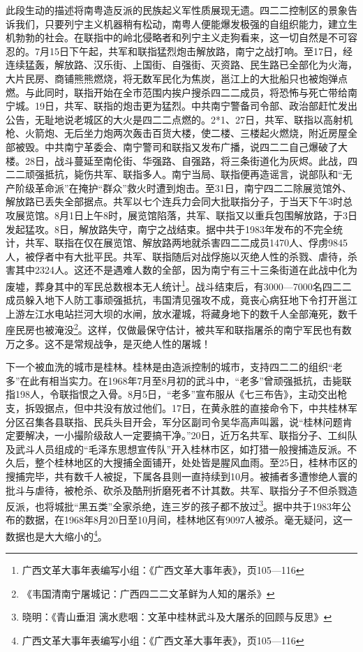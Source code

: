 此段生动的描述将南粤造反派的民族起义军性质展现无遗。四二二控制区的景象告诉我们，只要列宁主义机器稍有松动，南粤人便能爆发极强的自组织能力，建立生机勃勃的社会。在联指中的岭北侵略者和列宁主义走狗看来，这一切自然是不可容忍的。7月15日下午起，共军和联指猛烈炮击解放路，南宁之战打响。至17日，经连续猛轰，解放路、汉乐街、上国街、自强街、灭资路、民生路已全部化为火海，大片民房、商铺熊熊燃烧，将无数军民化为焦炭，邕江上的大批船只也被炮弹点燃。与此同时，联指开始在全市范围内挨户搜杀四二二成员，将恐怖与死亡带给南宁城。19日，共军、联指的炮击更为猛烈。中共南宁警备司令部、政治部赶忙发出公告，无耻地说老城区的大火是四二二点燃的。2*1、27日，共军、联指以高射机枪、火箭炮、无后坐力炮两次轰击百货大楼，使二楼、三楼起火燃烧，附近房屋全部被毁。中共南宁革委会、南宁警司和联指又发布广播，说四二二自己爆破了大楼。28日，战斗蔓延至南伦街、华强路、自强路，将三条街道化为灰烬。此战，四二二顽强抵抗，毙伤共军、联指多人。南宁当局、联指便再造谣言，说部队和“无产阶级革命派”在掩护“群众”救火时遭到炮击。至31日，南宁四二二除展览馆外、解放路已丢失全部据点。共军以七个连兵力会同大批联指分子，于当天下午3时总攻展览馆。8月1日上午8时，展览馆陷落，共军、联指又以重兵包围解放路，于3日发起猛攻。8日，解放路失守，南宁之战结束。据中共于1983年发布的不完全统计，共军、联指在仅在展览馆、解放路两地就杀害四二二成员1470人、俘虏9845人，被俘者中有大批平民。共军、联指随后对战俘施以灭绝人性的杀戮、虐待，杀害其中2324人。这还不是遇难人数的全部，因为南宁有三十三条街道在此战中化为废墟，葬身其中的军民总数根本无人统计\footnote{广西文革大事年表编写小组：《广西文革大事年表》，页105—116}。战斗结束后，有3000—7000名四二二成员躲入地下人防工事顽强抵抗，韦国清见强攻不成，竟丧心病狂地下令打开邕江上游左江水电站拦河大坝的水闸，放水灌城，将藏身地下的数千人全部淹死，数千座民房也被淹没\footnote{《韦国清南宁屠城记：广西四二二文革鲜为人知的屠杀》}。这样，仅做最保守估计，被共军和联指屠杀的南宁军民也有数万之多。这不是常规战争，是灭绝人性的屠城！

下一个被血洗的城市是桂林。桂林是由造派控制的城市，支持四二二的组织“老多”在此有相当实力。在1968年7月至8月初的武斗中，“老多”曾顽强抵抗，击毙联指198人，令联指恨之入骨。8月5日，“老多”宣布服从《七三布告》，主动交出枪支，拆毁据点，但中共没有放过他们。17日，在黄永胜的直接命令下，中共桂林军分区召集各县联指、民兵头目开会，军分区副司令吴华高声叫嚣，说“桂林问题肯定要解决，一小撮阶级敌人一定要搞干净。”20日，近万名共军、联指分子、工纠队及武斗人员组成的“毛泽东思想宣传队”开入桂林市区，如打猎一般搜捕造反派。不久后，整个桂林地区的大搜捕全面铺开，处处皆是腥风血雨。至25日，桂林市区的搜捕完毕，共有数千人被捉，下属各县则一直持续到10月。被捕者多遭惨绝人寰的批斗与虐待，被枪杀、砍杀及酷刑折磨死者不计其数。共军、联指分子不但杀戮造反派，也将城批“黑五类”全家杀绝，连三岁的孩子都不放过\footnote{晓明：《青山垂泪 漓水悲咽：文革中桂林武斗及大屠杀的回顾与反思》}。据中共于1983年公布的数据，在1968年8月20日至10月间，桂林地区有9097人被杀。毫无疑问，这一数据也是大大缩小的\footnote{广西文革大事年表编写小组：《广西文革大事年表》，页105—116}。

